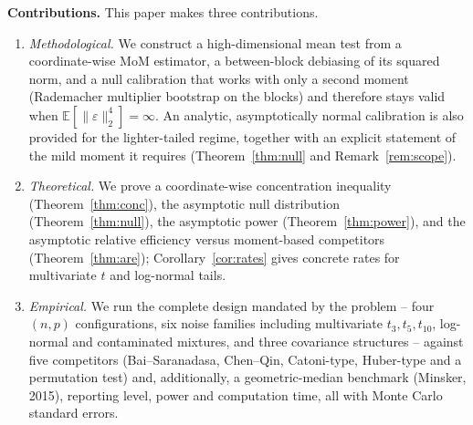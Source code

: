 \documentclass[pdflatex,sn-mathphys-num]{sn-jnl}
\newcommand{\E}{\mathbb{E}}
\newcommand{\normt}[1]{\lVert #1 \rVert_2}
\theoremstyle{thmstyleone}%
\theoremstyle{thmstyletwo}%
\theoremstyle{thmstylethree}%
\begin{document}
\textbf{Contributions.} This paper makes three contributions.
\begin{enumerate}
    \item \emph{Methodological.} We construct a high-dimensional mean test from
    a coordinate-wise MoM estimator, a between-block debiasing of its squared
    norm, and a null calibration that works with only a second moment
    (Rademacher multiplier bootstrap on the blocks) and therefore stays valid
    when $\E[\normt{\varepsilon}^4]=\infty$. An analytic, asymptotically normal
    calibration is also provided for the lighter-tailed regime, together with an
    explicit statement of the mild moment it requires (Theorem~\ref{thm:null} and
    Remark~\ref{rem:scope}).
    \item \emph{Theoretical.} We prove a coordinate-wise concentration
    inequality (Theorem~\ref{thm:conc}), the asymptotic null distribution
    (Theorem~\ref{thm:null}), the asymptotic power (Theorem~\ref{thm:power}), and
    the asymptotic relative efficiency versus moment-based competitors
    (Theorem~\ref{thm:are}); Corollary~\ref{cor:rates} gives concrete rates for
    multivariate $t$ and log-normal tails.
    \item \emph{Empirical.} We run the complete design mandated by the problem
    -- four $(n,p)$ configurations, six noise families including multivariate
    $t_3,t_5,t_{10}$, log-normal and contaminated mixtures, and three
    covariance structures -- against five competitors (Bai--Saranadasa,
    Chen--Qin, Catoni-type, Huber-type and a permutation test) and, additionally,
    a geometric-median benchmark (Minsker, 2015), reporting level, power and
    computation time, all with Monte Carlo standard errors.
\end{enumerate}
\end{document}

